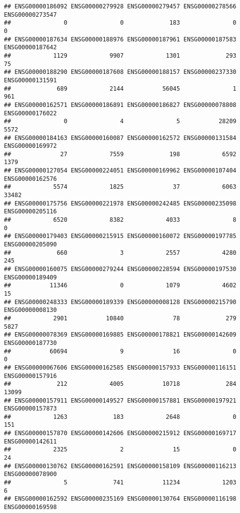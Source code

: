 \documentclass[
]{article}
\begin{document}
\begin{verbatim}
## ENSG00000186092 ENSG00000279928 ENSG00000279457 ENSG00000278566 ENSG00000273547 
##               0               0             183               0               0 
## ENSG00000187634 ENSG00000188976 ENSG00000187961 ENSG00000187583 ENSG00000187642 
##            1129            9907            1301             293              75 
## ENSG00000188290 ENSG00000187608 ENSG00000188157 ENSG00000237330 ENSG00000131591 
##             689            2144           56045               1             961 
## ENSG00000162571 ENSG00000186891 ENSG00000186827 ENSG00000078808 ENSG00000176022 
##               0               4               5           28209            5572 
## ENSG00000184163 ENSG00000160087 ENSG00000162572 ENSG00000131584 ENSG00000169972 
##              27            7559             198            6592            1379 
## ENSG00000127054 ENSG00000224051 ENSG00000169962 ENSG00000107404 ENSG00000162576 
##            5574            1825              37            6063           33482 
## ENSG00000175756 ENSG00000221978 ENSG00000242485 ENSG00000235098 ENSG00000205116 
##            6520            8382            4033               8               0 
## ENSG00000179403 ENSG00000215915 ENSG00000160072 ENSG00000197785 ENSG00000205090 
##             660               3            2557            4280             245 
## ENSG00000160075 ENSG00000279244 ENSG00000228594 ENSG00000197530 ENSG00000189409 
##           11346               0            1079            4602              15 
## ENSG00000248333 ENSG00000189339 ENSG00000008128 ENSG00000215790 ENSG00000008130 
##            2901           10840              78             279            5827 
## ENSG00000078369 ENSG00000169885 ENSG00000178821 ENSG00000142609 ENSG00000187730 
##           60694               9              16               0               0 
## ENSG00000067606 ENSG00000162585 ENSG00000157933 ENSG00000116151 ENSG00000157916 
##             212            4005           10718             284           13099 
## ENSG00000157911 ENSG00000149527 ENSG00000157881 ENSG00000197921 ENSG00000157873 
##            1263             183            2648               0             151 
## ENSG00000157870 ENSG00000142606 ENSG00000215912 ENSG00000169717 ENSG00000142611 
##            2325               2              15               0              24 
## ENSG00000130762 ENSG00000162591 ENSG00000158109 ENSG00000116213 ENSG00000078900 
##               5             741           11234            1203               6 
## ENSG00000162592 ENSG00000235169 ENSG00000130764 ENSG00000116198 ENSG00000169598 

\end{verbatim}
\end{document}
